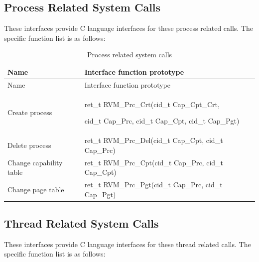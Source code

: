 \subsection{Process Related System Calls}\label{subsec:3-5-4}

These interfaces provide C language interfaces for these process related calls. The specific function list is as follows:

\begin{xltabular}{\textwidth}{@{}>{\hsize\raggedright\arraybackslash}X>{\hsize\raggedright\arraybackslash}X@{}}
\caption{Process related system calls}\label{tab:3-8}\\
\toprule
Name & Interface function prototype\tabularnewline
\endfirsthead
\toprule
Name & Interface function prototype\tabularnewline
\midrule
\endhead
\bottomrule
\endlastfoot
Create process\strut
 & ret\_\allowbreak{}t RVM\_\allowbreak{}Prc\_\allowbreak{}Crt(cid\_\allowbreak{}t Cap\_\allowbreak{}Cpt\_\allowbreak{}Crt,

cid\_\allowbreak{}t Cap\_\allowbreak{}Prc, cid\_\allowbreak{}t Cap\_\allowbreak{}Cpt, cid\_\allowbreak{}t Cap\_\allowbreak{}Pgt)\strut
\tabularnewline
Delete process & ret\_\allowbreak{}t RVM\_\allowbreak{}Prc\_\allowbreak{}Del(cid\_\allowbreak{}t Cap\_\allowbreak{}Cpt, cid\_\allowbreak{}t
Cap\_\allowbreak{}Prc)\tabularnewline
Change capability table & ret\_\allowbreak{}t RVM\_\allowbreak{}Prc\_\allowbreak{}Cpt(cid\_\allowbreak{}t Cap\_\allowbreak{}Prc, cid\_\allowbreak{}t
Cap\_\allowbreak{}Cpt)\tabularnewline
Change page table & ret\_\allowbreak{}t RVM\_\allowbreak{}Prc\_\allowbreak{}Pgt(cid\_\allowbreak{}t Cap\_\allowbreak{}Prc, cid\_\allowbreak{}t
Cap\_\allowbreak{}Pgt)\tabularnewline
\end{xltabular}

\subsection{Thread Related System Calls}\label{subsec:3-5-5}

These interfaces provide C language interfaces for these thread related calls. The specific function list is as follows:

